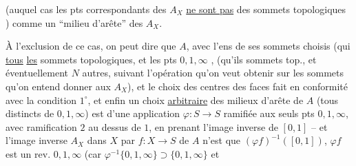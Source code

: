 (auquel cas les pts correspondants des
$A_X$ \uline{ne sont pas} des sommets topologiques
\unsure{\ldots})   
 comme un ``milieu
d'arête'' des $A_X$.

À l'exclusion de ce cas, on peut dire
que $A$, avec l'ens de ses sommets
choisis (qui   \uline{tous} \uline{les} sommets
topologiques, et les pts $0,1,\infty$ , (qu'ils
 sommets top., et éventuellement
$N$ autres,  suivant l'opération
qu'on veut obtenir sur les sommets
qu'on entend donner aux $A_X$), et
le choix des centres des faces fait
en conformité avec la condition $1^\circ$,
et enfin un choix \uline{arbitraire} des
milieux d'arête de $A$ (tous distincts
 de $0,1,\infty$) est  d'une
application $\varphi:S\to S$ ramifiée aux
seuls pts $0,1,\infty$, avec ramification
$2$ au dessus de $1$, en prenant l'image
inverse de $[0,1]$ -- et l'image inverse
 $A_X$ dans $X$ par $f:X\to S$ de
$A$ n'est que $(\varphi f)^{-1}([0,1])$,
 $\varphi f$ est  un rev. 
$0,1,\infty$ (car $\varphi^{-1}\{0,1,\infty\}\supset\{0,1,\infty\}$ et
